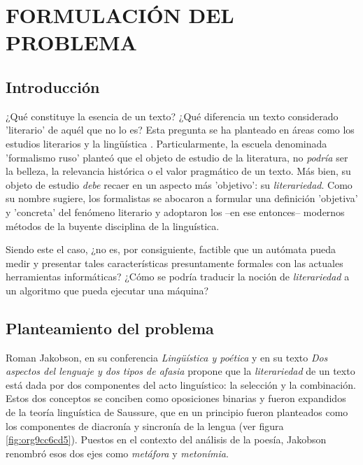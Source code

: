 \documentclass[12pt,letterpaper,twoside]{article}
\begin{document}
\section{FORMULACIÓN DEL PROBLEMA}
\label{sec:org4c6b582}
\subsection{Introducción}
\label{sec:org9df2268}

¿Qué constituye la esencia de un texto? ¿Qué diferencia un texto
considerado 'literario' de aquél que no lo es? Esta pregunta se ha
planteado en áreas como los estudios literarios y la lingüística
\cite{eijembaum2010teoria}. Particularmente, la escuela denominada
'formalismo ruso' planteó que el objeto de estudio de la literatura,
no \emph{podría} ser la belleza, la relevancia histórica o el valor
pragmático de un texto. Más bien, su objeto de estudio \emph{debe} recaer
en un aspecto más 'objetivo': su \emph{literariedad}.  Como su nombre
sugiere, los formalistas se abocaron a formular una definición
'objetiva' y 'concreta' del fenómeno literario y adoptaron los --en
ese entonces-- modernos métodos de la buyente disciplina de la
linguística.

Siendo este el caso, ¿no es, por consiguiente, factible que un
autómata pueda medir y presentar tales características presuntamente
formales con las actuales herramientas informáticas? ¿Cómo se podría
traducir la noción de \emph{literariedad} a un algoritmo que pueda ejecutar
una máquina?


\subsection{Planteamiento del problema}
\label{sec:org868a493}

Roman Jakobson, en su conferencia \emph{Lingüística y poética}
\cite{jakobson1981linguistica} y en su texto \emph{Dos aspectos del lenguaje y dos
tipos de afasia} \cite{jakobson1956two} propone que la
\emph{literariedad} de un texto está dada por dos componentes del acto
linguístico: la selección y la combinación. Estos dos conceptos se
conciben como oposiciones binarias y fueron expandidos de la
teoría linguística de Saussure, que en un principio fueron
planteados como los componentes de diacronía y sincronía de la
lengua (ver figura \ref{fig:org9cc6cd5}). Puestos en el contexto del
análisis de la poesía, Jakobson renombró esos dos ejes como
\emph{metáfora} y \emph{metonímia}.
\end{document}
